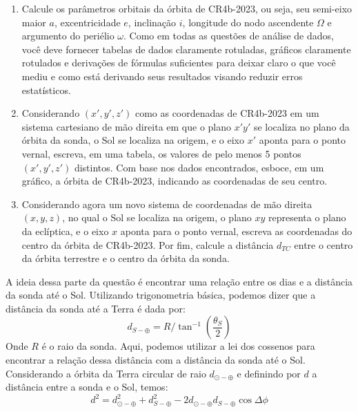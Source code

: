 \documentclass[11pt]{article}
\begin{document}
\begin{pproblem}
    \begin{enumerate}[label=(\alph*)]
        \item Calcule os parâmetros orbitais da órbita de CR4b-2023, ou seja, seu semi-eixo maior \(a\), excentricidade \(e\), inclinação \(i\), longitude do nodo ascendente \(\Omega\) e argumento do periélio \(\omega\). Como em todas as questões de análise de dados, você deve fornecer tabelas de dados claramente rotuladas, gráficos claramente rotulados e derivações de fórmulas suficientes para deixar claro o que você mediu e como está derivando seus resultados visando reduzir erros estatísticos.
        
        \item Considerando \((x', y', z')\) como as coordenadas de CR4b-2023 em um sistema cartesiano de mão direita em que o plano \(x'y'\) se localiza no plano da órbita da sonda, o Sol se localiza na origem, e o eixo \(x'\) aponta para o ponto vernal, escreva, em uma tabela, os valores de pelo menos 5 pontos \((x', y', z')\) distintos. Com base nos dados encontrados, esboce, em um gráfico, a órbita de CR4b-2023, indicando as coordenadas de seu centro.
        
        \item Considerando agora um novo sistema de coordenadas de mão direita \((x, y, z)\), no qual o Sol se localiza na origem, o plano \(xy\) representa o plano da eclíptica, e o eixo \(x\) aponta para o ponto vernal, escreva as coordenadas do centro da órbita de CR4b-2023. Por fim, calcule a distância \(d_{TC}\) entre o centro da órbita terrestre e o centro da órbita da sonda.
    \end{enumerate}

    \begin{pssolution*}{}{}
        \begin{alternativas}
            \item A ideia dessa parte da questão é encontrar uma relação entre os dias e a distância da sonda até o Sol. Utilizando trigonometria básica, podemos dizer que a distância da sonda até a Terra é dada por:
            \[d_{S-\oplus} = R/\tan^{-1}\left(\frac{\theta_S}{2}\right)\]
            Onde \(R\) é o raio da sonda.
            Aqui, podemos utilizar a lei dos cossenos para encontrar a relação dessa distância com a distância da sonda até o Sol. Considerando a órbita da Terra circular de raio \(d_{\odot-\oplus}\) e definindo por \(d\) a distância entre a sonda e o Sol, temos:
            \[d^2 = d_{\odot-\oplus}^2+d_{S-\oplus}^2-2d_{\odot-\oplus}d_{S-\oplus}\cos\Delta\phi\]      
            

\end{alternativas}
\end{pssolution*}
\end{pproblem}
\end{document}
